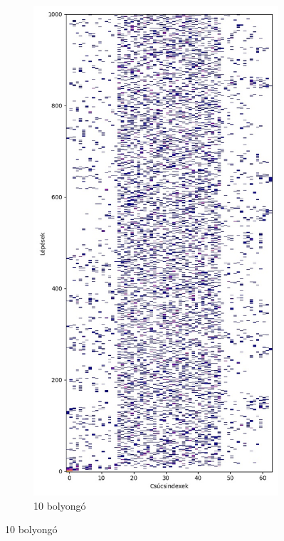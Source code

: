 \begin{figure}[H]
\begin{subfigure}{.40\linewidth}
  \end{subfigure}
  \begin{subfigure}{.40\linewidth}
    \centering
    \includegraphics[width=\linewidth]{./figures/ragasztott_binaris/sim01.jpg}
    \caption{10 bolyongó}
  \end{subfigure}
\end{figure}

